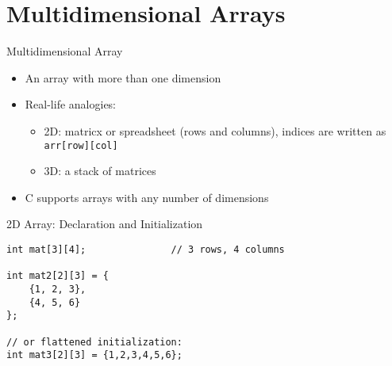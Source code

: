 \documentclass[12pt, aspectratio=169]{beamer}
\begin{document}






    \section{Multidimensional Arrays}


    \begin{frame}{Multidimensional Array}
        \begin{itemize}
            \item An array with more than one dimension
            \item Real-life analogies:
                \begin{itemize}
                    \item 2D: matricx or spreadsheet (rows and columns), indices are written as \texttt{arr[row][col]}
                    \item 3D: a stack of matrices
                \end{itemize}
            \item C supports arrays with any number of dimensions
        \end{itemize}
    \end{frame}

    \begin{frame}[fragile]{2D Array: Declaration and Initialization}
        \begin{verbatim}
int mat[3][4];               // 3 rows, 4 columns

int mat2[2][3] = {
    {1, 2, 3},
    {4, 5, 6}
};

// or flattened initialization:
int mat3[2][3] = {1,2,3,4,5,6};
        \end{verbatim}
    \end{frame}
\end{document}
